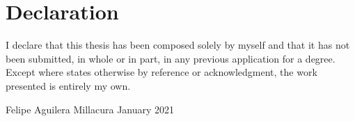 \chapter{Declaration}
\vspace*{2\baselineskip}
 I declare that this thesis has been composed solely by myself and that it has not been submitted, in whole or in part, in any previous application for a degree. Except where states otherwise by reference or acknowledgment, the work presented is entirely my own.
\vspace{6\baselineskip}\\
\begin{flushright}
\hspace*{\fill}
Felipe Aguilera Millacura
\newline
January 2021
\end{flushright}


\cleardoublepage
